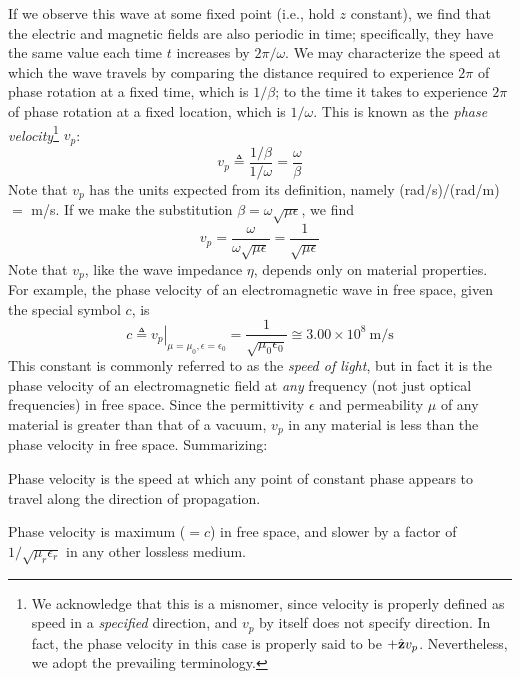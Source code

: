If we observe this wave at some fixed point (i.e., hold $z$ constant), we find that the electric and magnetic fields are also periodic in time; specifically, they have the same value each time $t$ increases by $2\pi/\omega$.  We may characterize the speed at which the wave travels by comparing 
the distance required to experience $2\pi$ of phase rotation at a fixed time, which is $1/\beta$; to
the time it takes to experience $2\pi$ of phase rotation at a fixed location, which is $1/\omega$.  This is known as the {\it phase velocity}\footnote{We acknowledge that this is a misnomer, since velocity is properly defined as speed in a \emph{specified} direction, and $v_p$ by itself does not specify direction. In fact, the phase velocity in this case is properly said to be $+\hat{\bf z}v_p$.  Nevertheless, we adopt the prevailing terminology.} $v_p$:
%
\begin{equation}
v_p \triangleq \frac{1/\beta}{1/\omega} = \frac{\omega}{\beta} 
\end{equation}
%
Note that $v_p$ has the units expected from its definition, namely (rad/s)/(rad/m) $=$ m/s. If we make the substitution $\beta=\omega\sqrt{\mu\epsilon}$, we find
%
\begin{equation}
v_p = \frac{\omega}{\omega\sqrt{\mu\epsilon}} = \frac{1}{\sqrt{\mu\epsilon}}
\end{equation}
%
Note that $v_p$, like the wave impedance $\eta$, depends only on material properties.  
For example, the phase velocity of an electromagnetic wave in free space, given the special symbol $c$, is
%
\begin{equation}
c \triangleq \left. v_p \right|_{\mu=\mu_0, \epsilon=\epsilon_0} = \frac{1}{\sqrt{\mu_0\epsilon_0 }} \cong 3.00 \times 10^8~\mbox{m/s}
\end{equation}
%
This constant is commonly referred to as the \emph{speed of light}, 
but in fact it is the phase velocity of an electromagnetic field at \emph{any} frequency (not just optical frequencies) in free space.  
Since the permittivity $\epsilon$ and permeability $\mu$ of any material is greater than that of a vacuum, $v_p$ in any material is less than the phase velocity in free space.
Summarizing:
%
\begin{mdframed}[backgroundcolor=yellow!20,nobreak=true] 
Phase velocity is the speed at which any point of constant phase appears to travel along the direction of propagation.
\end{mdframed}
%
\begin{mdframed}[backgroundcolor=yellow!20,nobreak=true] 
Phase velocity is maximum ($=c$) in free space, and slower by a factor of $1/\sqrt{\mu_r\epsilon_r}$ in any other lossless medium. 
\end{mdframed}

